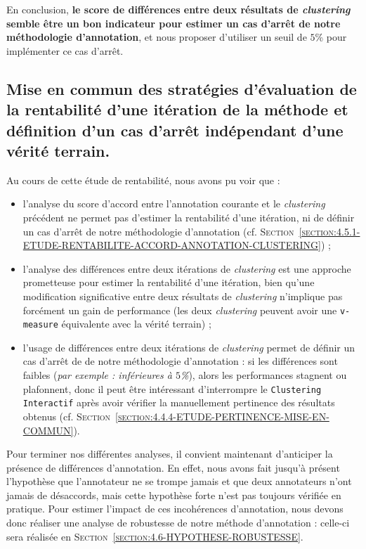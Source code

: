 			En conclusion, \textbf{le score de différences entre deux résultats de \textit{clustering} semble être un bon indicateur pour estimer un cas d'arrêt de notre méthodologie d'annotation}, et nous proposer d'utiliser un seuil de $5$\% pour implémenter ce cas d'arrêt.
			
	\subsection{Mise en commun des stratégies d'évaluation de la rentabilité d'une itération de la méthode et définition d'un cas d'arrêt indépendant d'une vérité terrain.}
	\label{section:4.5.3-ETUDE-RENTABILITE-MISE-EN-COMMUN}
			
		\begin{leftBarSummary}
			Au cours de cette étude de rentabilité, nous avons pu voir que :
			\begin{itemize}
				\item[\itemko] l'analyse du score d'accord entre l'annotation courante et le \textit{clustering} précédent ne permet pas d'estimer la rentabilité d'une itération, ni de définir un cas d'arrêt de notre méthodologie d'annotation (cf. \textsc{Section~\ref{section:4.5.1-ETUDE-RENTABILITE-ACCORD-ANNOTATION-CLUSTERING}}) ;
				\item[\itemok] l'analyse des différences entre deux itérations de \textit{clustering} est une approche prometteuse pour estimer la rentabilité d'une itération, bien qu'une modification significative entre deux résultats de \textit{clustering} n'implique pas forcément un gain de performance (les deux \textit{clustering} peuvent avoir une \texttt{v-measure} équivalente avec la vérité terrain) ;
				\item[\itemok] l'usage de différences entre deux itérations de \textit{clustering} permet de définir un cas d'arrêt de de notre méthodologie d'annotation : si les différences sont faibles (\textit{par exemple : inférieures à $5$\%}), alors les performances stagnent ou plafonnent, donc il peut être intéressant d'interrompre le \texttt{Clustering Interactif} après avoir vérifier la manuellement pertinence des résultats obtenus (cf. \textsc{Section~\ref{section:4.4.4-ETUDE-PERTINENCE-MISE-EN-COMMUN}}).
			\end{itemize}
		\end{leftBarSummary}
		
		Pour terminer nos différentes analyses, il convient maintenant d'anticiper la présence de différences d'annotation.
		En effet, nous avons fait jusqu'à présent l'hypothèse que l'annotateur ne se trompe jamais et que deux annotateurs n'ont jamais de désaccords, mais cette hypothèse forte n'est pas toujours vérifiée en pratique.
		Pour estimer l'impact de ces incohérences d'annotation, nous devons donc réaliser une analyse de robustesse de notre méthode d'annotation : celle-ci sera réalisée en \textsc{Section~\ref{section:4.6-HYPOTHESE-ROBUSTESSE}}.